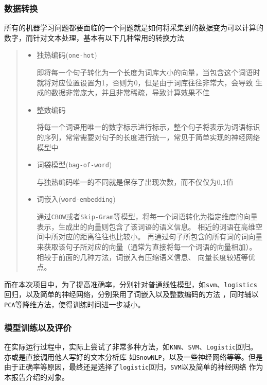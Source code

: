 \documentclass[UTF8]{ctexart}
\begin{document}
\subsubsection{数据转换}
所有的机器学习问题都要面临的一个问题就是如何将采集到的数据变为可以计算的数字，而针对文本处理，基本有以下几种常用的转换方法
\begin{quote}
    \begin{itemize}
        \item 独热编码(\lstinline{one-hot})
            
            即将每一个句子转化为一个长度为词库大小的向量，当包含这个词语时就将对应位置设置为1，否则为0，但是由于词库往往非常大，会导致
            生成的数据非常庞大，并且非常稀疏，导致计算效果不佳
        \item 整数编码
            
        将每一个词语用唯一的数字标示进行标示，整个句子将表示为词语标识的序列，常常需要对句子的长度进行统一，常见于简单实现的神经网络模型中
        
        \item 词袋模型(\lstinline{bag-of-word})
        
        与独热编码唯一的不同就是保存了出现次数，而不仅仅为0,1值

        \item 词嵌入(\lstinline{word-embedding})
        
        通过\lstinline{CBOW}或者\lstinline{Skip-Gram}等模型，将每一个词语转化为指定维度的向量表示，生成出的向量则包含了该词语的语义信息。
        相近的词语在高维空间中所对应的距离往往也比较小。
        再通过句子所包含的所有词的词向量来获取该句子所对应的向量（通常为直接将每一个词语的向量相加）。相较于前面的几种方法，词嵌入有压缩语义信息、
        向量长度较短等优点。
    \end{itemize}
\end{quote}

而在本次项目中，为了提高准确率，分别针对普通线性模型，如\lstinline{svm}、\lstinline{logistics}回归，以及简单的神经网络，分别采用了词嵌入以及整数编码的方法
，同时辅以\lstinline{PCA}等降维方法，使得训练时间进一步减小。

\subsubsection{模型训练以及评价}
在实际运行过程中，实际上尝试了非常多种方法，如\lstinline{KNN}、\lstinline{SVM}、\lstinline{Logistic}回归。亦或是直接调用他人写好的文本分析库
如\lstinline{SnowNLP}，以及一些神经网络等等。但是由于正确率等原因，最终还是选择了\lstinline{logistic}回归，\lstinline{SVM}以及简单的神经网络
作为本报告介绍的对象。
\end{document}
